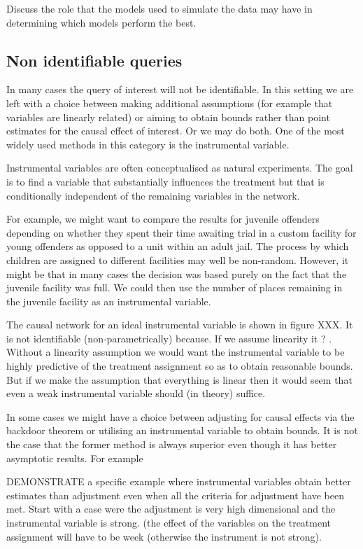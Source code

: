 \documentclass[11pt,a4paper,oneside]{book}
\theoremstyle{plain}
\theoremstyle{definition}
\begin{document}
Discuss the role that the models used to simulate the data may have in determining which models perform the best. 

\subsection{Non identifiable queries}
In many cases the query of interest will not be identifiable. In this setting we are left with a choice between making additional assumptions (for example that variables are linearly related) or aiming to obtain bounds rather than point estimates for the causal effect of interest. Or we may do both. One of the most widely used methods in this category is the instrumental variable. 

Instrumental variables are often conceptualised as natural experiments. The goal is to find a variable that substantially influences the treatment but that is conditionally independent of the remaining variables in the network. 

For example, we might want to compare the results for juvenile offenders depending on whether they spent their time awaiting trial in a custom facility for young offenders as opposed to a unit within an adult jail. The process by which children are assigned to different facilities may well be non-random. However, it might be that in many cases the decision was based purely on the fact that the juvenile facility was full. We could then use the number of places remaining in the juvenile facility as an instrumental variable. 

The causal network for an ideal instrumental variable is shown in figure XXX. It is not identifiable (non-parametrically) because. If we assume linearity it ? . Without a linearity assumption we would want the instrumental variable to be highly predictive of the treatment assignment so as to obtain reasonable bounds. But if we make the assumption that everything is linear then it would seem that even a weak instrumental variable should (in theory) suffice. 

In some cases we might have a choice between adjusting for causal effects via the backdoor theorem or utilising an instrumental variable to obtain bounds. It is not the case that the former method is always superior even though it has better asymptotic results. For example 

DEMONSTRATE a specific example where instrumental variables obtain better estimates than adjustment even when all the criteria for adjustment have been met. Start with a case were the adjustment is very high dimensional and the instrumental variable is strong. (the effect of the variables on the treatment assignment will have to be week (otherwise the instrument is not strong). 
\end{document}
